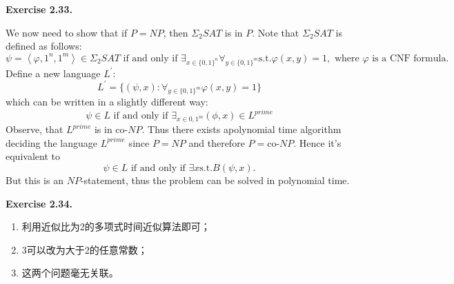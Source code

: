 \documentclass[a4paper]{article}
\newenvironment{exercise}[1]{
	\par
	\noindent\textbf{Exercise #1.}\quad
}{
	\par
	\bigskip
}
\begin{document}
\begin{exercise}{2.33}	
	We now need to show that if $P=NP$, then $\Sigma_2 SAT$ is in $P$. Note that $\Sigma_2 SAT$ is defined as follows:
	\begin{equation*}
	 \psi=\left\langle \varphi,1^{n},1^{m} \right\rangle \in  \Sigma_2 SAT  \text{   if and only if   } \exists_{x\in \{0,1\}^n} \forall_{y \in \{0,1 \}^m} \text{s.t.} \varphi(x,y)=1,\text{  where }\varphi \text{ is a CNF formula.} 
	\end{equation*}
	Define a new language $L^{\prime}$:
	\begin{equation*}
	     	L^{\prime}=\{(\psi,x): \forall_{y \in \{0,1\}^m} \varphi(x,y)=1\}
	\end{equation*}
	which can be written in a slightly different way:
	\begin{equation*}
		\psi \in L \text{  if and only if  } \exists_{x \in {0,1}^m} (\phi,x) \in L^{prime}
	\end{equation*}
	Observe, that $L^{prime}$ is in co-$NP$. Thus there exists apolynomial time algorithm deciding the language $L^{prime}$ since $P=NP$ and therefore $P=$co-$NP$. Hence it's equivalent to 
	\begin{equation*}
	       \psi \in L \text{  if and only if  } \exists x \text{s.t.} B(\psi,x). 
	\end{equation*}
	But this is an $NP$-statement, thus the problem can be solved in polynomial time.
\end{exercise}

	\begin{exercise}{2.34}
		\begin{enumerate}
	        \item 利用近似比为2的多项式时间近似算法即可；
			\item 3可以改为大于2的任意常数；
			\item 这两个问题毫无关联。
		\end{enumerate}
	\end{exercise}
\end{document}
